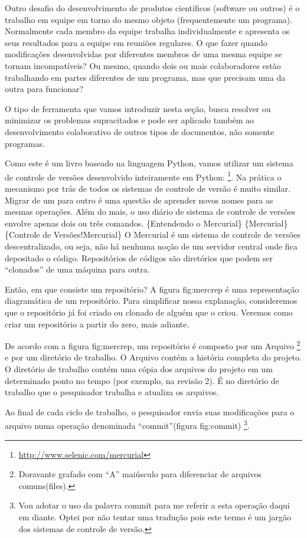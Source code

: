 \documentclass[a4paper,10pt,portuguese]{sphinxmanual}
\begin{document}
Outro desafio do desenvolvimento de produtos científicos (software
ou outros) é o trabalho em equipe em torno do mesmo objeto
(frequentemente um programa). Normalmente cada membro da equipe
trabalha individualmente e apresenta os seus resultados para a
equipe em reuniões regulares. O que fazer quando modificações
desenvolvidas por diferentes membros de uma mesma equipe se tornam
incompatíveis? Ou mesmo, quando dois ou mais colaboradores estão
trabalhando em partes diferentes de um programa, mas que precisam
uma da outra para funcionar?

O tipo de ferramenta que vamos introduzir nesta seção, busca
resolver ou minimizar os problemas supracitados e pode ser aplicado
também ao desenvolvimento colaborativo de outros tipos de
documentos, não somente programas.

Como este é um livro baseado na linguagem Python, vamos utilizar um
sistema de controle de versões desenvolvido inteiramente em Python:
 \footnote{
\href{http://www.selenic.com/mercurial}{http://www.selenic.com/mercurial}
}. Na prática o mecanismo por trás de todos os
sistemas de controle de versão é muito similar. Migrar de um para
outro é uma questão de aprender novos nomes para as mesmas
operações. Além do mais, o uso diário de sistema de controle de
versões envolve apenas dois ou três comandos.
\{Entendendo o Mercurial\} \{Mercurial\}
\{Controle de Versões!Mercurial\} O Mercurial é um sistema de
controle de versões descentralizado, ou seja, não há nenhuma noção
de um servidor central onde fica depositado o código. Repositórios
de códigos são diretórios que podem ser ``clonados'' de uma máquina
para outra.

Então, em que consiste um repositório? A figura fig:mercrep é uma
representação diagramática de um repositório. Para simplificar
nossa explanação, consideremos que o repositório já foi criado ou
clonado de alguém que o criou. Veremos como criar um repositório a
partir do zero, mais adiante.

De acordo com a figura fig:mercrep, um repositório é composto por
um Arquivo \footnote{
Doravante grafado com ``A'' maiúsculo para diferenciar de arquivos
comuns(files).
} e por um diretório de trabalho. O Arquivo contém a
história completa do projeto. O diretório de trabalho contém uma
cópia dos arquivos do projeto em um determinado ponto no tempo (por
exemplo, na revisão 2). É no diretório de trabalho que o
pesquisador trabalha e atualiza os arquivos.

Ao final de cada ciclo de trabalho, o pesquisador envia suas
modificações para o arquivo numa operação denominada
``commit''(figura fig:commit) \footnote{
Vou adotar o uso da palavra commit para me referir a esta operação
daqui em diante. Optei por não tentar uma tradução pois este termo
é um jargão dos sistemas de controle de versão.
}.
\end{document}
